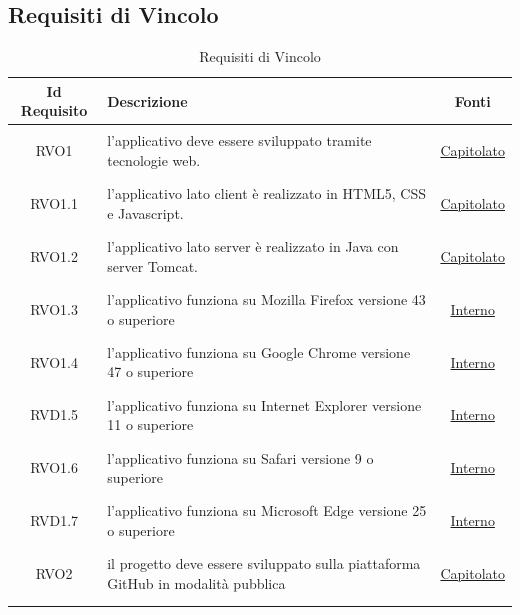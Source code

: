 \subsection{Requisiti di Vincolo}
\normalsize
\begin{longtable}{|c|>{\centering}m{7cm}|c|}
\hline 
\textbf{Id Requisito} & \textbf{Descrizione} & \textbf{Fonti}\\
\hline
\endhead
\hypertarget{RVO1}{RVO1} & l'applicativo deve essere sviluppato tramite tecnologie web. & \hyperlink{Capitolato}{Capitolato}\\ \hline

\hypertarget{RVO1.1}{RVO1.1} & l'applicativo lato client è realizzato in HTML5, CSS e Javascript. & \hyperlink{Capitolato}{Capitolato}\\ \hline

\hypertarget{RVO1.2}{RVO1.2} & l'applicativo lato server è realizzato in Java con server Tomcat. & \hyperlink{Capitolato}{Capitolato}\\ \hline

\hypertarget{RVO1.3}{RVO1.3} & l'applicativo funziona su Mozilla Firefox versione 43 o superiore & \hyperlink{Interno}{Interno}\\ \hline

\hypertarget{RVO1.4}{RVO1.4} & l'applicativo funziona su Google Chrome versione 47 o superiore	 & \hyperlink{Interno}{Interno}\\ \hline

\hypertarget{RVD1.5}{RVD1.5} & l'applicativo funziona su Internet Explorer versione 11 o superiore  & \hyperlink{Interno}{Interno}\\ \hline

\hypertarget{RVO1.6}{RVO1.6} & l'applicativo funziona su Safari versione 9 o superiore & \hyperlink{Interno}{Interno}\\ \hline

\hypertarget{RVD1.7}{RVD1.7} & l'applicativo funziona su Microsoft Edge versione 25 o superiore & \hyperlink{Interno}{Interno}\\ \hline

\hypertarget{RVO2}{RVO2} & il progetto deve essere sviluppato sulla piattaforma GitHub in modalità pubblica & \hyperlink{Capitolato}{Capitolato}\\ \hline

\caption[Requisiti di Vincolo]{Requisiti di Vincolo}
\label{tabella:req3}
\end{longtable}
\clearpage

